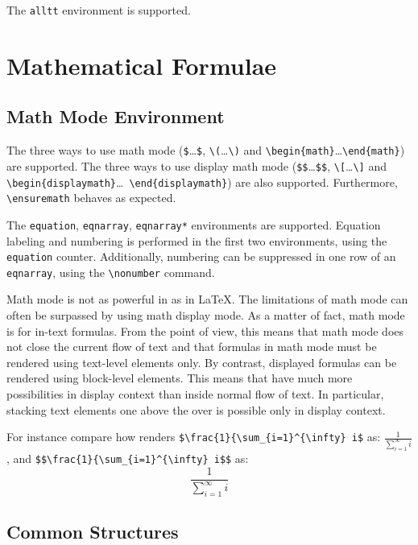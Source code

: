 The \verb+alltt+ environment is supported.

\section{Mathematical Formulae}

\subsection{Math Mode Environment}
The three ways to use math mode (\verb+$+\ldots\verb+$+,
\verb+\(+\ldots\verb+\)+ and
\verb+\begin{math}+\ldots\verb+\end{math}+) are supported.
The three ways to use display math mode (\verb+$$+\ldots\verb+$$+,
\verb+\[+\ldots\verb+\]+ and
\verb+\begin{displaymath}+\ldots\ \verb+\end{displaymath}+) are also
supported.
Furthermore, \verb+\ensuremath+ behaves as expected.


The \verb+equation+, \verb+eqnarray+, \verb+eqnarray*+ environments
are supported.
Equation labeling and numbering is performed in the first two
environments, using the \verb+equation+ counter.
Additionally, numbering can be suppressed in one row of an
\verb+eqnarray+, using the \verb+\nonumber+ command.


Math mode is not as powerful in \hevea{} as in \LaTeX{}.  The
limitations of math mode can often be surpassed by using math display
mode.  As a matter of fact, math mode is for in-text formulas. From
the \html{} point of view, this means that math mode does not close
the current flow of text and that formulas in math mode must be
rendered using text-level elements only.  By contrast, displayed
formulas can be rendered using block-level elements.  This means that
\hevea{} have much more possibilities in display context than inside
normal flow of text.  In particular, stacking text elements one above
the over is possible only in display context.
\begin{htmlonly}
For instance compare how \hevea{} renders
\verb+$\frac{1}{\sum_{i=1}^{\infty} i$+
as: $\frac{1}{\sum_{i=1}^{\infty} i}$, and 
\verb+$$\frac{1}{\sum_{i=1}^{\infty} i$$+ as:
$$\frac{1}{\sum_{i=1}^{\infty} i}$$
\end{htmlonly}


\subsection{Common Structures}

